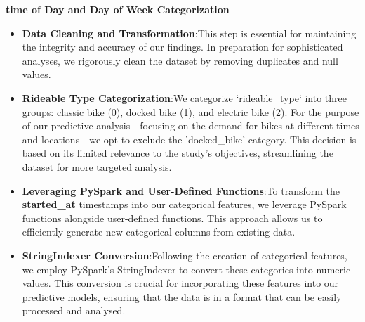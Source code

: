     \textbf{time of Day and Day of Week Categorization}\newline
    \begin{itemize}
        \item \textbf{Data Cleaning and Transformation}:\newline This step is essential for maintaining the integrity and accuracy of our findings. In preparation for sophisticated analyses, we rigorously clean the dataset by removing duplicates and null values.
        \item \textbf{Rideable Type Categorization}:\newline We categorize `rideable\_type` into three groups: classic bike (0), docked bike (1), and electric bike (2).
                        For the purpose of our predictive analysis—focusing on the demand for bikes at different times and locations—we opt to exclude the 'docked\_bike' category.
                        This decision is based on its limited relevance to the study's objectives, streamlining the dataset for more targeted analysis.
        \item \textbf{Leveraging PySpark and User-Defined Functions}:\newline To transform the \textbf{started\_at} timestamps into our categorical features, we leverage PySpark functions alongside user-defined functions. This approach allows us to efficiently generate new categorical columns from existing data.
        \item \textbf{StringIndexer Conversion}:\newline Following the creation of categorical features, we employ PySpark's StringIndexer to convert these categories into numeric values. This conversion is crucial for incorporating these features into our predictive models, ensuring that the data is in a format that can be easily processed and analysed.

      \end{itemize}

